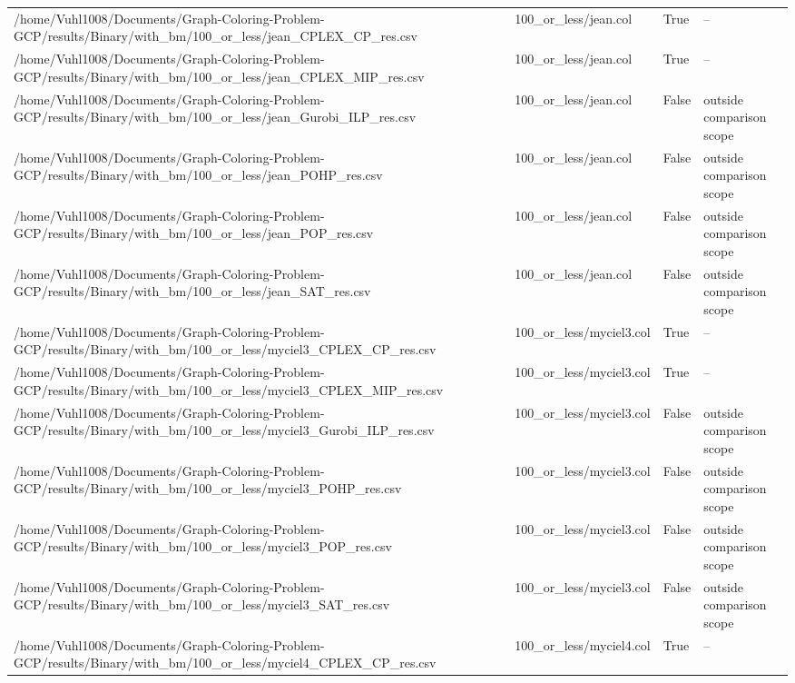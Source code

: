 \begin{table}[htbp]
\begin{tabular}{llll}
/home/Vuhl1008/Documents/Graph-Coloring-Problem-GCP/results/Binary/with\_bm/100\_or\_less/jean\_CPLEX\_CP\_res.csv & 100\_or\_less/jean.col & True & -- \\
/home/Vuhl1008/Documents/Graph-Coloring-Problem-GCP/results/Binary/with\_bm/100\_or\_less/jean\_CPLEX\_MIP\_res.csv & 100\_or\_less/jean.col & True & -- \\
/home/Vuhl1008/Documents/Graph-Coloring-Problem-GCP/results/Binary/with\_bm/100\_or\_less/jean\_Gurobi\_ILP\_res.csv & 100\_or\_less/jean.col & False & outside comparison scope \\
/home/Vuhl1008/Documents/Graph-Coloring-Problem-GCP/results/Binary/with\_bm/100\_or\_less/jean\_POHP\_res.csv & 100\_or\_less/jean.col & False & outside comparison scope \\
/home/Vuhl1008/Documents/Graph-Coloring-Problem-GCP/results/Binary/with\_bm/100\_or\_less/jean\_POP\_res.csv & 100\_or\_less/jean.col & False & outside comparison scope \\
/home/Vuhl1008/Documents/Graph-Coloring-Problem-GCP/results/Binary/with\_bm/100\_or\_less/jean\_SAT\_res.csv & 100\_or\_less/jean.col & False & outside comparison scope \\
/home/Vuhl1008/Documents/Graph-Coloring-Problem-GCP/results/Binary/with\_bm/100\_or\_less/myciel3\_CPLEX\_CP\_res.csv & 100\_or\_less/myciel3.col & True & -- \\
/home/Vuhl1008/Documents/Graph-Coloring-Problem-GCP/results/Binary/with\_bm/100\_or\_less/myciel3\_CPLEX\_MIP\_res.csv & 100\_or\_less/myciel3.col & True & -- \\
/home/Vuhl1008/Documents/Graph-Coloring-Problem-GCP/results/Binary/with\_bm/100\_or\_less/myciel3\_Gurobi\_ILP\_res.csv & 100\_or\_less/myciel3.col & False & outside comparison scope \\
/home/Vuhl1008/Documents/Graph-Coloring-Problem-GCP/results/Binary/with\_bm/100\_or\_less/myciel3\_POHP\_res.csv & 100\_or\_less/myciel3.col & False & outside comparison scope \\
/home/Vuhl1008/Documents/Graph-Coloring-Problem-GCP/results/Binary/with\_bm/100\_or\_less/myciel3\_POP\_res.csv & 100\_or\_less/myciel3.col & False & outside comparison scope \\
/home/Vuhl1008/Documents/Graph-Coloring-Problem-GCP/results/Binary/with\_bm/100\_or\_less/myciel3\_SAT\_res.csv & 100\_or\_less/myciel3.col & False & outside comparison scope \\
/home/Vuhl1008/Documents/Graph-Coloring-Problem-GCP/results/Binary/with\_bm/100\_or\_less/myciel4\_CPLEX\_CP\_res.csv & 100\_or\_less/myciel4.col & True & -- \\

\end{tabular}
\end{table}
